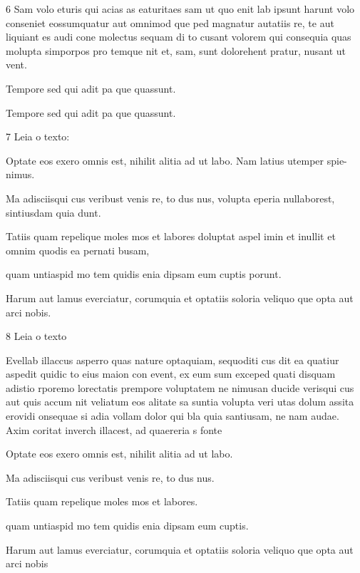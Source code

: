 \num{6} Sam volo eturis qui acias as eaturitaes sam ut quo enit lab ipsunt harunt volo
conseniet eossumquatur aut omnimod que ped magnatur autatiis re, te aut
liquiant es audi cone molectus sequam di to cusant volorem qui consequia quas
molupta simporpos pro temque nit et, sam, sunt dolorehent pratur, nusant ut
vent.

\begin{escolha}
\item Tempore sed qui adit pa que quassunt.
\end{escolha}

\linhas

\begin{escolha}
\item Tempore sed qui adit pa que quassunt.
\end{escolha}

\linhas

\num{7} Leia o texto:

\lipsum[1]

Optate eos exero omnis est, nihilit alitia ad ut labo. Nam latius utemper spie-
nimus.

\begin{escolha}
\item Ma adisciisqui cus veribust venis re, to dus nus, volupta eperia nullaborest,
sintiusdam quia dunt.
\item Tatiis quam repelique moles mos et labores doluptat aspel imin et inullit et
omnim quodis ea pernati busam,
\item quam untiaspid mo tem quidis enia dipsam eum cuptis porunt.
\item Harum aut lamus everciatur, corumquia et optatiis soloria veliquo que opta
aut arci nobis.
\end{escolha}

\num{8} Leia o texto

Evellab illaccus asperro quas nature optaquiam, sequoditi cus dit ea quatiur
aspedit quidic to eius maion con event, ex eum sum exceped quati disquam
adistio rporemo lorectatis prempore voluptatem ne nimusan ducide verisqui
cus aut quis accum nit veliatum eos alitate sa suntia volupta veri utas dolum
assita erovidi onsequae si adia vollam dolor qui bla quia santiusam, ne nam
audae. Axim coritat inverch illacest, ad quaereria s
fonte

Optate eos exero omnis est, nihilit alitia ad ut labo.

\begin{escolha}
\item Ma adisciisqui cus veribust venis re, to dus nus.
\item Tatiis quam repelique moles mos et labores.
\item quam untiaspid mo tem quidis enia dipsam eum cuptis.
\item Harum aut lamus everciatur, corumquia et optatiis soloria veliquo que opta
aut arci nobis
\end{escolha}

\lipsum[1-20]
